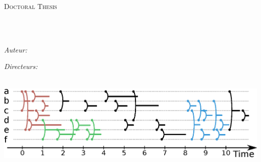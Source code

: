 




\frontmatter %

\pagestyle{plain} %


\begin{titlepage}
\begin{center}

{\scshape\LARGE \univname\par}\vspace{1.5cm} %
\textsc{\Large Doctoral Thesis}\\[0.5cm] %

\HRule \\[0.4cm] %
{\huge \bfseries \ttitle\par}\vspace{0.4cm} %
\HRule \\[1.5cm] %
 
\begin{minipage}[t]{0.4\textwidth}
\begin{flushleft} \large
\emph{Auteur:}\\
\authorname %
\end{flushleft}
\end{minipage}
\begin{minipage}[t]{0.4\textwidth}
\begin{flushright} \large
\emph{Directeurs:} \\
\supname %
\end{flushright}
\end{minipage}\\[3cm]
\includegraphics[width=\linewidth]{img/GroupeDense/GroupExample/Zone_dense.eps}
 

\end{center}
\end{titlepage}
